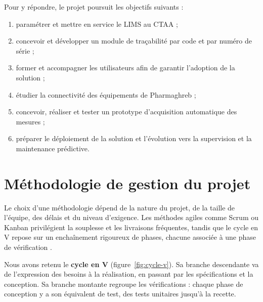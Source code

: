 Pour y répondre, le projet poursuit les objectifs suivants :
\begin{enumerate}
    \item paramétrer et mettre en service le \ac{LIMS} au \ac{CTAA} ;
    \item concevoir et développer un module de traçabilité par code et par numéro de série ;
    \item former et accompagner les utilisateurs afin de garantir l'adoption de la solution ;
    \item étudier la connectivité des équipements de Pharmaghreb ;
    \item concevoir, réaliser et tester un prototype d'acquisition automatique des mesures ;
    \item préparer le déploiement de la solution et l'évolution vers la supervision et la maintenance prédictive.
\end{enumerate}

\section{Méthodologie de gestion du projet}

Le choix d'une méthodologie dépend de la nature du projet, de la taille de l'équipe, des délais et du niveau d'exigence. Les méthodes agiles comme Scrum ou Kanban privilégient la souplesse et les livraisons fréquentes, tandis que le cycle en V repose sur un enchaînement rigoureux de phases, chacune associée à une phase de vérification \citep{forsberg1991}.

Nous avons retenu le \textbf{cycle en V} (figure~\ref{fig:cycle-v}). Sa branche descendante va de l'expression des besoins à la réalisation, en passant par les spécifications et la conception. Sa branche montante regroupe les vérifications : chaque phase de conception y a son équivalent de test, des tests unitaires jusqu'à la recette.

